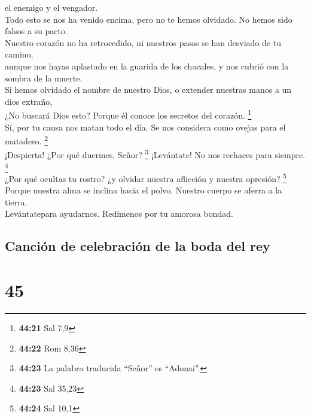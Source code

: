 el enemigo y el vengador.\\
 Todo esto se nos ha venido encima, pero no te hemos
olvidado. No hemos sido falsos a su pacto.\\
 Nuestro corazón no ha retrocedido, ni nuestros pasos se
han desviado de tu camino,\\
 aunque nos hayas aplastado en la guarida de los
chacales, y nos cubrió con la sombra de la muerte.\\
 Si hemos olvidado el nombre de nuestro Dios, o extender
nuestras manos a un dios extraño,\\
 ¿No buscará Dios esto? Porque él conoce los secretos del
corazón. \footnote{\textbf{44:21} Sal 7,9}\\
 Sí, por tu causa nos matan todo el día. Se nos considera
como ovejas para el matadero. \footnote{\textbf{44:22} Rom 8,36}\\
 ¡Despierta! ¿Por qué duermes, Señor? \footnote{\textbf{44:23}
  La palabra traducida ``Señor'' es ``Adonai''.} ¡Levántate! No nos
rechaces para siempre. \footnote{\textbf{44:23} Sal 35,23}\\
 ¿Por qué ocultas tu rostro? ¿y olvidar nuestra aflicción
y nuestra opresión? \footnote{\textbf{44:24} Sal 10,1}\\
 Porque nuestra alma se inclina hacia el polvo. Nuestro
cuerpo se aferra a la tierra.\\
 Levántatepara ayudarnos. Redímenos por tu amorosa
bondad.

\hypertarget{canciuxf3n-de-celebraciuxf3n-de-la-boda-del-rey}{%
\subsection{Canción de celebración de la boda del
rey}\label{canciuxf3n-de-celebraciuxf3n-de-la-boda-del-rey}}

\hypertarget{section-43}{%
\section{45}\label{section-43}}

